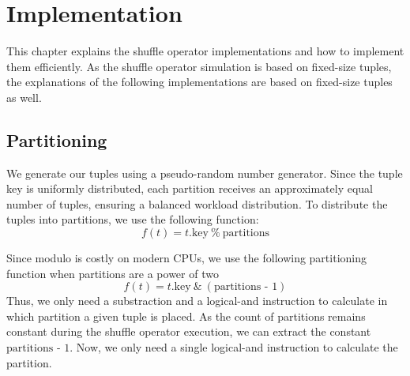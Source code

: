 
\chapter{Implementation}\label{chapter:implementations}\acresetall
This chapter explains the shuffle operator implementations and how to implement them efficiently.
As the shuffle operator simulation is based on fixed-size tuples, the explanations of the following implementations are based on fixed-size tuples as well.

\section{Partitioning}\label{sec-partitioning}
We generate our tuples using a pseudo-random number generator.
Since the tuple key is uniformly distributed, each partition receives an approximately equal number of tuples, ensuring a balanced workload distribution.
To distribute the tuples into partitions, we use the following function:
\begin{equation}
  f(t) = t\textrm{.key}\ \%\ \textrm{partitions}
\end{equation}

Since modulo is costly on modern \acp{CPU}, we use the following partitioning function when partitions are a power of two
\begin{equation}
  f(t) = t\textrm{.key}\ \&\ (\textrm{partitions - 1})
\end{equation}
Thus, we only need a substraction and a logical-and instruction to calculate in which partition a given tuple is placed.
As the count of partitions remains constant during the shuffle operator execution, we can extract the constant $\textrm{partitions - 1}$.
Now, we only need a single logical-and instruction to calculate the partition.
